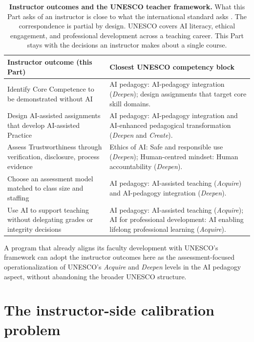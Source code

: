 \documentclass{SIAMbook2023}
\begin{document}
\begin{table}[ht]
\centering
\caption{\textbf{Instructor outcomes and the UNESCO teacher framework.} What this Part asks of an instructor is close to what the international standard asks \citep{miao2024aib}. The correspondence is partial by design. UNESCO covers AI literacy, ethical engagement, and professional development across a teaching career. This Part stays with the decisions an instructor makes about a single course.}
\label{tab:instructor-unesco}
\begin{tabularx}{\textwidth}{>{\raggedright\arraybackslash}X >{\raggedright\arraybackslash}X}
\toprule
\textbf{Instructor outcome (this Part)} & \textbf{Closest UNESCO competency block} \\
\midrule
Identify Core Competence to be demonstrated without AI & AI pedagogy: AI-pedagogy integration (\emph{Deepen}); design assignments that target core skill domains. \\
\addlinespace
Design AI-assisted assignments that develop AI-assisted Practice & AI pedagogy: AI-pedagogy integration and AI-enhanced pedagogical transformation (\emph{Deepen} and \emph{Create}). \\
\addlinespace
Assess Trustworthiness through verification, disclosure, process evidence & Ethics of AI: Safe and responsible use (\emph{Deepen}); Human-centred mindset: Human accountability (\emph{Deepen}). \\
\addlinespace
Choose an assessment model matched to class size and staffing & AI pedagogy: AI-assisted teaching (\emph{Acquire}) and AI-pedagogy integration (\emph{Deepen}). \\
\addlinespace
Use AI to support teaching without delegating grades or integrity decisions & AI pedagogy: AI-assisted teaching (\emph{Acquire}); AI for professional development: AI enabling lifelong professional learning (\emph{Acquire}). \\
\bottomrule
\end{tabularx}
\end{table}

A program that already aligns its faculty development with UNESCO's framework can adopt the instructor outcomes here as the assessment-focused operationalization of UNESCO's \emph{Acquire} and \emph{Deepen} levels in the AI pedagogy aspect, without abandoning the broader UNESCO structure.

\section{The instructor-side calibration problem}
\label{i:sec:central-problem}%
\end{document}
